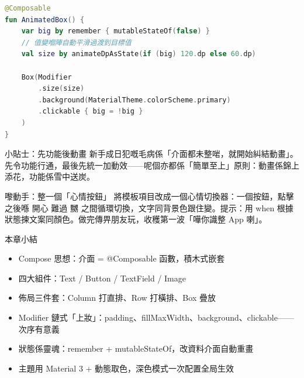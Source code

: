 \begin{lstlisting}[language=Kotlin]
@Composable
fun AnimatedBox() {
    var big by remember { mutableStateOf(false) }
    // 值變嗰陣自動平滑過渡到目標值
    val size by animateDpAsState(if (big) 120.dp else 60.dp)

    Box(Modifier
        .size(size)
        .background(MaterialTheme.colorScheme.primary)
        .clickable { big = !big }
    )
}
\end{lstlisting}

\begin{tcbinfo}{小貼士：先功能後動畫}
新手成日犯嘅毛病係「介面都未整啱，就開始糾結動畫」。先令功能行通，最後先統一加動效——呢個亦都係「簡單至上」原則：動畫係錦上添花，功能係雪中送炭。

\end{tcbinfo}

\begin{tcbpractice}{嚟動手：整一個「心情按鈕」}
將模板項目改成一個心情切換器：一個按鈕，點擊之後喺 開心 難過 嬲 之間循環切換，文字同背景色跟住變。提示：用 when 根據狀態揀文案同顏色。做完傳畀朋友玩，收穫第一波「嘩你識整 App 喇」。

\end{tcbpractice}

\begin{tcbsummary}{本章小結}
\begin{itemize}
  \item Compose 思想：介面 = @Composable 函數，積木式嵌套
  \item 四大組件：Text / Button / TextField / Image
  \item 佈局三件套：Column 打直排、Row 打橫排、Box 疊放
  \item Modifier 鏈式「上妝」：padding、fillMaxWidth、background、clickable——次序有意義
  \item 狀態係靈魂：remember + mutableStateOf，改資料介面自動重畫
  \item 主題用 Material 3 + 動態取色，深色模式一次配置全局生效
\end{itemize}

\end{tcbsummary}

